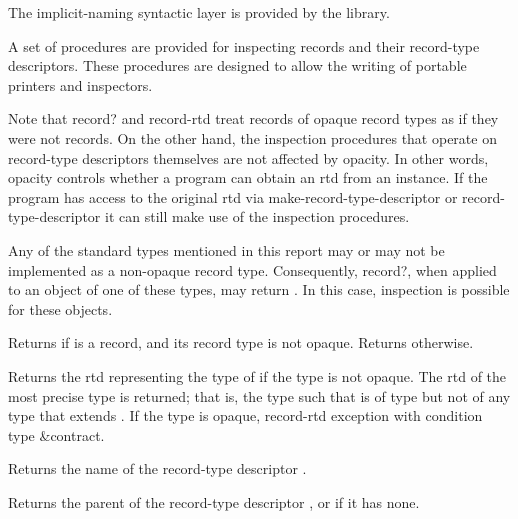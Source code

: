 The implicit-naming syntactic layer is provided by the
 library.

A set of procedures are provided for inspecting records and their
record-type descriptors. These procedures are designed to allow the
writing of portable printers and inspectors.

Note that {\cf record?} and {\cf record-rtd} treat records of opaque
record types as if they were not records. On the other hand, the
inspection procedures that operate on record-type descriptors
themselves are not affected by opacity. In other words, opacity
controls whether a program can obtain an rtd from an instance. If the
program has access to the original rtd via {\cf
  make-record-type-descriptor} or {\cf record-type-descriptor} it can
still make use of the inspection procedures.

Any of the standard types mentioned in this report may or may not be
implemented as a non-opaque record type.  Consequently, {\cf record?},
when applied to an object of one of these types, may return
\schtrue{}.  In this case, inspection is possible for these objects.

\begin{entry}{%
}
   
Returns \schtrue{} if  is a record, and its record type is
not opaque. Returns \schfalse{} otherwise.  
\end{entry}

\begin{entry}{%
}
   
Returns the rtd representing the type of  if the type is not
opaque. The rtd of the most precise type is returned; that is, the
type  such that  is of type  but not of any
type that extends .  If the type is opaque, {\cf record-rtd} exception
with condition type {\cf\&contract}.
\end{entry}

\begin{entry}{%
}
   
Returns the name of the record-type descriptor .
\end{entry}   

\begin{entry}{%
}
   
Returns the parent of the record-type descriptor , or
\schfalse{} if it has none.
\end{entry}

